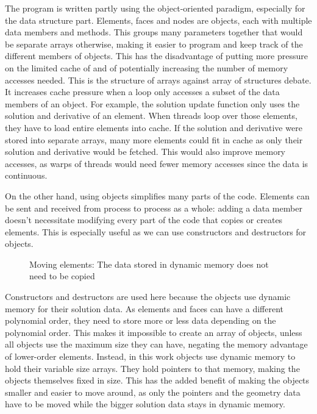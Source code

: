 The program is written partly using the object-oriented paradigm, especially for the data structure
part. Elements, faces and nodes are objects, each with multiple data members and methods. This
groups many parameters together that would be separate arrays otherwise, making it easier to program
and keep track of the different members of objects. This has the disadvantage of putting more
pressure on the limited cache of  and of potentially increasing the number of
memory accesses needed. This is the structure of arrays against array of structures debate. It
increases cache pressure when a loop only accesses a subset of the data members of an object. For
example, the solution update function only uses the solution and derivative of an element. When
threads loop over those elements, they have to load entire elements into cache. If the solution and
derivative were stored into separate arrays, many more elements could fit in cache as only their
solution and derivative would be fetched. This would also improve memory accesses, as warps of
threads would need fewer memory accesses since the data is continuous.

On the other hand, using objects simplifies many parts of the code. Elements can be sent and
received from process to process as a whole: adding a data member doesn't necessitate modifying
every part of the code that copies or creates elements. This is especially useful as we can use
constructors and destructors for objects.

\begin{figure}[H]
	\centering
	
	\caption{Moving elements: The data stored in dynamic memory does not need to be copied}\label{fig:moving_elements}
\end{figure}

Constructors and destructors are used here because the objects use dynamic memory for their solution
data. As elements and faces can have a different polynomial order, they need to store more or less
data depending on the polynomial order. This makes it impossible to create an array of objects,
unless all objects use the maximum size they can have, negating the memory advantage of lower-order
elements. Instead, in this work objects use dynamic memory to hold their variable size arrays. They
hold pointers to that memory, making the objects themselves fixed in size. This has the added
benefit of making the objects smaller and easier to move around, as only the pointers and the
geometry data have to be moved while the bigger solution data stays in dynamic memory. 

